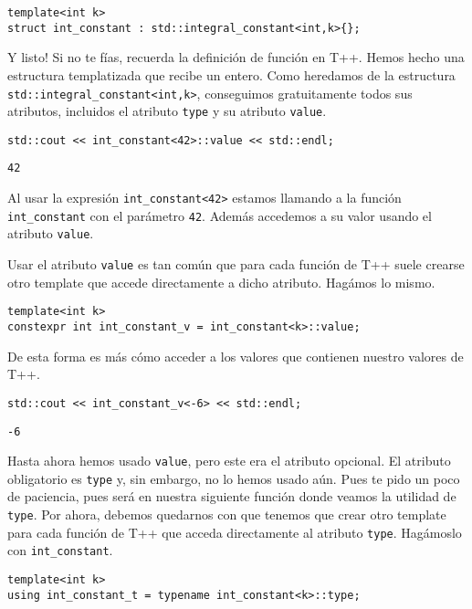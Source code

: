 \documentclass[11pt]{article}
\begin{document}
\begin{verbatim}
template<int k>
struct int_constant : std::integral_constant<int,k>{};
\end{verbatim}

Y listo! Si no te fías, recuerda la definición de función en T++. Hemos hecho una estructura templatizada que recibe un entero. Como heredamos de la estructura \texttt{std::integral\_constant<int,k>}, conseguimos gratuitamente todos sus atributos, incluidos el atributo \texttt{type} y su atributo \texttt{value}.

\begin{verbatim}
std::cout << int_constant<42>::value << std::endl;
\end{verbatim}

\begin{verbatim}
42
\end{verbatim}


Al usar la expresión \texttt{int\_constant<42>} estamos llamando a la función \texttt{int\_constant} con el parámetro \texttt{42}. Además accedemos a su valor usando el atributo \texttt{value}.

Usar el atributo \texttt{value} es tan común que para cada función de T++ suele crearse otro template que accede directamente a dicho atributo. Hagámos lo mismo.

\begin{verbatim}
template<int k>
constexpr int int_constant_v = int_constant<k>::value;
\end{verbatim}

De esta forma es más cómo acceder a los valores que contienen nuestro valores de T++.

\begin{verbatim}
std::cout << int_constant_v<-6> << std::endl;
\end{verbatim}

\begin{verbatim}
-6
\end{verbatim}


Hasta ahora hemos usado \texttt{value}, pero este era el atributo opcional. El atributo obligatorio es \texttt{type} y, sin embargo, no lo hemos usado aún. Pues te pido un poco de paciencia, pues será en nuestra siguiente función donde veamos la utilidad de \texttt{type}. Por ahora, debemos quedarnos con que tenemos que crear otro template para cada función de T++ que acceda directamente al atributo \texttt{type}. Hagámoslo con \texttt{int\_constant}.

\begin{verbatim}
template<int k>
using int_constant_t = typename int_constant<k>::type;
\end{verbatim}
\end{document}
